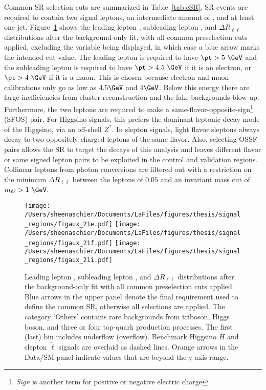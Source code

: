  Common SR selection cuts are summarized in Table~\ref{tab:cSR}.  SR events are required to contain two signal leptons, an intermediate amount of \met, and at least one jet.  Figure~\ref{fig:sr:cm1} shows the leading lepton \pt, subleading lepton \pt, and $\Delta R_{\ell\ell}$ distributions after the background-only fit, with all common preselection cuts applied, excluding the variable being displayed, in which case a blue arrow marks the intended cut value.  The leading lepton is required to have $\pt > 5~\GeV$ and the subleading lepton is required to have $\pt > 4.5~\GeV$ if it is an electron, or $\pt > 4~\GeV$ if it is a muon.  This is chosen because electron and muon calibrations only go as low as $4.5\GeV$ and $4\GeV$.  Below this energy there are large inefficiencies from cluster reconstruction and the fake backgrounds blow-up.  Furthermore, the two leptons are required to make a same-flavor-opposite-sign\footnote{\textit{Sign} is another term for positive or negative electric charge} (SFOS) pair.  For Higgsino signals, this prefers the dominant leptonic decay mode of the Higgsino, via an off-shell $Z^*$.  In slepton signals, light flavor sleptons always decay to two oppositely charged leptons of the same flavor.  Also, selecting OSSF pairs allows the SR to target the decays of this analysis and leaves different flavor or same signed lepton pairs to be exploited in the control and validation regions.  Collinear leptons from photon conversions are filtered out with a restriction on the minimum $\Delta R_{\ell\ell}$ between the leptons of $0.05$ and an invariant mass cut of $m_{\ell\ell} > 1 ~\GeV$.  
   \begin{figure}%
  \begin{center}
  \texttt{[image: /Users/sheenaschier/Documents/LaFiles/figures/thesis/signal\_regions/figaux\_21e.pdf]}
   \texttt{[image: /Users/sheenaschier/Documents/LaFiles/figures/thesis/signal\_regions/figaux\_21f.pdf]}
      \texttt{[image: /Users/sheenaschier/Documents/LaFiles/figures/thesis/signal\_regions/figaux\_21i.pdf]}
   \end{center}
 \caption{Leading lepton \pt, subleading lepton \pt, and $\Delta R_{\ell\ell}$ distributions after the background-only fit with all common preselection cuts applied.  Blue arrows in the upper panel denote the final requirement used to define the common SR, otherwise all selections are applied. The category `Others' contains rare backgrounds from triboson, Higgs boson, and three or four top-quark production processes. The first (last) bin includes underflow (overflow).  Benchmark Higgsino $\tilde H$ and slepton $\tilde\ell$ signals are overlaid as dashed lines. Orange arrows in the Data/SM panel indicate values that are beyond the y-axis range.}
 \label{fig:sr:cm1}
 \end{figure}
 
